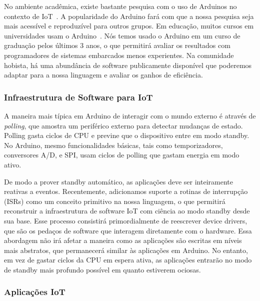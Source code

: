 \documentclass[12pt,english]{amsart}
\begin{document}
No ambiente acadêmica, existe bastante pesquisa com o uso de Arduinos no
contexto de IoT~\cite{arduino.infra,arduino.health,arduino.home,arduino.energy}.
A popularidade do Arduino fará com que a nossa pesquisa seja mais acessível e
reproduzível para outros grupos.
Em educação, muitos cursos em universidades usam o Arduino~\cite{arduino.edu.1,arduino.edu.2,arduino.edu.3,arduino.edu.4}.
Nós temos usado o Arduino em um curso de graduação pelos últimos 3 anos, o que
permitirá avaliar os resultados com programadores de sistemas embarcados menos
experientes.
Na comunidade hobista, há uma abundância de software publicamente disponível
que poderemos adaptar para a nossa linguagem e avaliar os ganhos de eficiência.

\subsubsection{Infraestrutura de Software para IoT}
\label{sec.method.software}

A maneira mais típica em Arduino de interagir com o mundo externo é através de
\emph{polling}, que amostra um periférico externo para detectar mudanças de
estado.
Polling gasta ciclos de CPU e previne que o dispositivo entre em modo standby.
No Arduino, mesmo funcionalidades básicas, tais como temporizadores,
conversores A/D, e SPI, usam ciclos de polling que gastam energia em modo
ativo.

De modo a prover standby automático, as aplicações deve ser inteiramente
reativas a eventos.
%
Recentemente, adicionamos suporte a rotinas de interrupção (ISRs) como um
conceito primitivo na nossa linguagem, o que permitirá reconstruir a
infraestrutura de software IoT com ciência ao modo standby desde sua base.
%
Esse processo consistirá primordialmente de reescrever device drivers, que são
os pedaços de software que interagem diretamente com o hardware.
%
Essa abordagem não irá afetar a maneira como as aplicações são escritas em
níveis mais abstratos, que permanecerá similar às aplicações em Arduino.
No entanto, em vez de gastar ciclos da CPU em espera ativa, as aplicações
entrarão no modo de standby mais profundo possível em quanto estiverem ociosas.

\subsubsection{Aplicações IoT}
\label{sec.method.apps}
\end{document}
